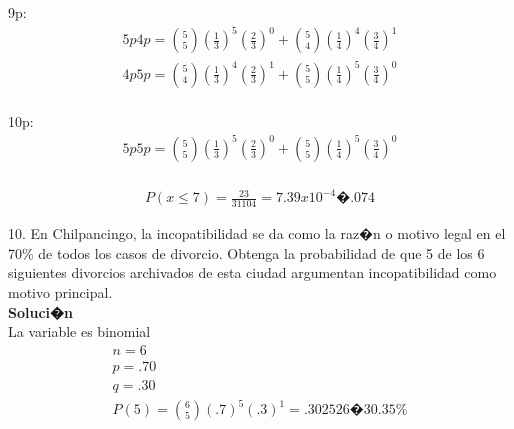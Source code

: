 \documentclass{article}
\begin{document}
\begin{enumerate}
    9p:
    \begin{gather*}
         5p 4p = \binom{5}{5}(\frac{1}{3})^{5}(\frac{2}{3})^0 + \binom{5}{4}(\frac{1}{4})^{4}(\frac{3}{4})^1\\
         4p 5p = \binom{5}{4}(\frac{1}{3})^{4}(\frac{2}{3})^1 + \binom{5}{5}(\frac{1}{4})^{5}(\frac{3}{4})^0\\
    \end{gather*}
     
    10p:
    \begin{gather*}
         5p 5p = \binom{5}{5}(\frac{1}{3})^{5}(\frac{2}{3})^0 + \binom{5}{5}(\frac{1}{4})^{5}(\frac{3}{4})^0\\
    \end{gather*}
    
    \begin{gather*}
        P(x \leq 7) = \frac{23}{31104} = 7.39x10^{-4} � .074%
    \end{gather*}
    
    	10. En Chilpancingo, la incopatibilidad se da como la raz�n o motivo legal en el 70\% de todos los casos de divorcio. Obtenga la probabilidad de que 5 de los 6 siguientes divorcios archivados de esta ciudad argumentan incopatibilidad como motivo principal.
    \\\textbf{Soluci�n}\\La variable es binomial
    \begin{gather*}    
    	n = 6\\
    	p = .70 \\
    	q = .30 \\
    	P(5) = \binom{6}{5}(.7)^5(.3)^1 = .302526 � 30.35\%
    \end{gather*}
    
\end{enumerate}
\end{document}
